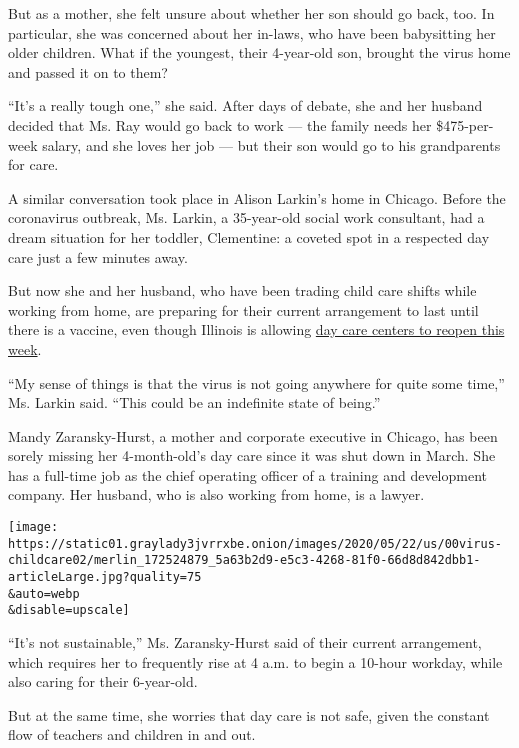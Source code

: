 But as a mother, she felt unsure about whether her son should go back,
too. In particular, she was concerned about her in-laws, who have been
babysitting her older children. What if the youngest, their 4-year-old
son, brought the virus home and passed it on to them?

``It's a really tough one,'' she said. After days of debate, she and her
husband decided that Ms. Ray would go back to work --- the family needs
her \$475-per-week salary, and she loves her job --- but their son would
go to his grandparents for care.

A similar conversation took place in Alison Larkin's home in Chicago.
Before the coronavirus outbreak, Ms. Larkin, a 35-year-old social work
consultant, had a dream situation for her toddler, Clementine: a coveted
spot in a respected day care just a few minutes away.

But now she and her husband, who have been trading child care shifts
while working from home, are preparing for their current arrangement to
last until there is a vaccine, even though Illinois is allowing
\href{https://www.chicagotribune.com/coronavirus/ct-coronavirus-illinois-child-care-facilities-reopen-daycare-20200522-tbsreoatqfeblldhkx7lmfe3km-story.html}{day
care centers to reopen this week}.

``My sense of things is that the virus is not going anywhere for quite
some time,'' Ms. Larkin said. ``This could be an indefinite state of
being.''

Mandy Zaransky-Hurst, a mother and corporate executive in Chicago, has
been sorely missing her 4-month-old's day care since it was shut down in
March. She has a full-time job as the chief operating officer of a
training and development company. Her husband, who is also working from
home, is a lawyer.

\texttt{[image: https://static01.graylady3jvrrxbe.onion/images/2020/05/22/us/00virus-childcare02/merlin\_172524879\_5a63b2d9-e5c3-4268-81f0-66d8d842dbb1-articleLarge.jpg?quality=75\\\&auto=webp\\\&disable=upscale]}

``It's not sustainable,'' Ms. Zaransky-Hurst said of their current
arrangement, which requires her to frequently rise at 4 a.m. to begin a
10-hour workday, while also caring for their 6-year-old.

But at the same time, she worries that day care is not safe, given the
constant flow of teachers and children in and out.

\href{https://www.nytimes3xbfgragh.onion/news-event/coronavirus?action=click\&pgtype=Article\&state=default\&region=MAIN_CONTENT_3\&context=storylines_faq}{}

